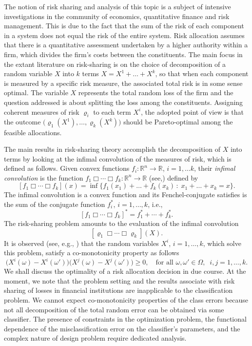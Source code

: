 \documentclass[10pt,letterpaper]{article}
\newcommand{\R}{\mathbb{R}}
\newcommand{\1}{1{\hskip -2.55 pt}\hbox{I}}
\begin{document}
The notion of risk sharing and analysis of this topic is a subject of intensive investigations in the community of economics, quantitative finance and risk management. This is due to the fact that the sum of the risk of each component in a system does not equal the risk of the entire system.
Risk allocation assumes that there is a quantitative assessment undertaken by a higher authority
within a firm, which  divides the firm's costs between the constituents.
The main focus in the extant literature on risk-sharing is on the choice of decomposition of a random variable $X$ into $k$ terms $X=X^1+\dots + X^k$, so that when each component is measured by a specific risk measure, the associated total risk is in some sense optimal. The variable $X$ represents the total random loss of the firm and the question addressed is about splitting the loss among the  constituents.
Assigning coherent measures of risk $\varrho_i$ to each term $X^i$, the adopted point of view is that the outcome $\big(\varrho_1(X^1), \dots, \varrho_k(X^k)\big)$ should be Pareto-optimal among the feasible allocations.

The main results in risk-sharing theory accomplish the decomposition of $X$ into terms by looking at the infimal convolution of the measures of risk, which is defined as follows. Given convex functions $f_i:\R^n\to \R$, $i=1,\dots k$, their \emph{infimal convolution} is the function 
$f_{1}\Box \cdots \Box f_{k} :\R^n\to \R$  (see,\cite[p. 57]{Rock-duality}) defined by
\[
[f_{1}\Box \cdots \Box f_{k}] (x) = \inf \{ f_{1}(x_1)+\dots + f_{k}(x_k) \,:\; x_1+\dots +x_k=x \}.
\]
The infimal convolution is a convex function and its Fenchel-conjugate satisfies is the sum of the conjugate function $f_i^*$,  $i=1,\dots, k$, i.e.,
\[
[f_{1}\Box \cdots \Box f_{k}]^{*}=f_{1}^{*}+\cdots +f_{k}^{*}.
\]
The risk-sharing problem amounts to the evaluation of the infimal convolution 
\[
[\varrho_{1}\Box \cdots \Box \varrho_{k}] (X).
\]
It is observed (see, e.g., \cite{landsberger1994co,ludkovski2008comonotonicity}) that the random variables $X^i$, $i=1,\dots, k$, which solve this problem, satisfy a co-monotonicity property as follows
\[
\big(X^i(\omega) -X^i(\omega')\Big)\big(X^j(\omega) -X^j(\omega')\Big) \geq 0,\quad\text{for all } \omega,\omega'\in\varOmega,\;\; i,j=1,\dots,k.
\]
We shall discuss the optimality of a risk allocation decision in due course. At the moment, 
we note that the problem setting and the results associate with risk sharing of losses in financial institutions are inapplicable to the classification problem. We cannot expect co-monotonicity properties of the class errors because not all decomposition of the total random error can be obtained via some classifier. The presence of constraints in the optimization problem, the functional dependence of the misclassification error on the classifier's parameters, and the complex nature of design problem require dedicated analysis.
\end{document}
